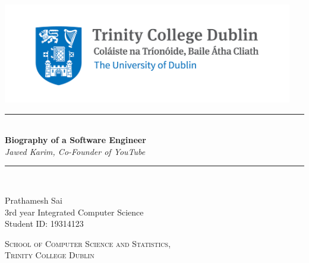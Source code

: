 \documentclass[12pt,a4paper]{article}
\newcommand{\HRule}{\rule{\linewidth}{0.5mm}}
\begin{document}
\begin{titlepage}
\begin{center}

\includegraphics[width=0.95\textwidth]{images/Trinity_Main_Logo.jpeg}~\\[2cm]


\HRule \\[0.4cm]
{ \LARGE 
  \textbf{Biography of a Software Engineer}\\[0.4cm]
  \emph{Jawed Karim, Co-Founder of YouTube}\\[0.4cm]
}
\HRule \\[1.5cm]

\bigbreak

\vskip 1in

{ \large
  Prathamesh Sai \\[0.1cm]
  3rd year Integrated Computer Science\\[0.1cm]
  Student ID: 19314123\\[0.1cm]
}

\vfill

\textsc{\large School of Computer Science and Statistics,\\Trinity College Dublin}\\[0.4cm]



 
\end{center}
\end{titlepage}



\newpage




\newpage
\setcounter{page}{1}

\end{document}
